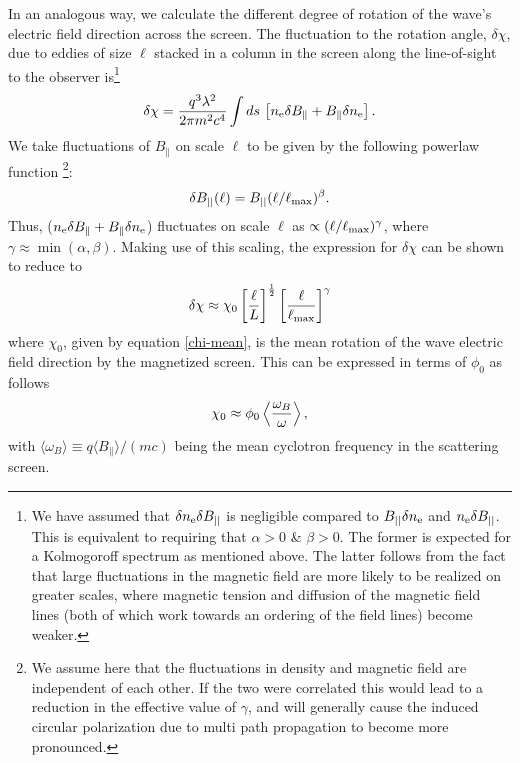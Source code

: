 \documentclass[fleqn,usenatbib]{mnras}
\begin{document}
	In an analogous way, we calculate the different degree of rotation of the wave's electric field direction across the screen. The fluctuation to the rotation angle, $\delta\chi$, due to eddies of size $\ell$ stacked in a column in the screen along the line-of-sight to the observer is\footnote{We have assumed that $\delta n_{\rm e} \delta B_{||}$ is negligible compared to $B_{||}\delta n_{\rm e}$ and $n_{\rm e}\delta B_{||}$. This is equivalent to requiring that $\alpha>0$ \& $\beta>0$. The former is expected for a Kolmogoroff spectrum as mentioned above. The latter follows from the fact that large fluctuations in the magnetic field are more likely to be realized on greater scales, where magnetic tension and diffusion of the magnetic field lines (both of which work towards an ordering of the field lines) become weaker.}
	\begin{equation}
		\delta\chi = {q^3\lambda^2\over 2\pi m^2 c^4} \int ds\, \left[ n_{\rm e}\delta B_\parallel + B_\parallel \delta n_{\rm e}\right].
	\end{equation}
	We take fluctuations of $B_\parallel$ on scale $\ell$ to be given by the following powerlaw function \footnote{We assume here that the fluctuations in density and magnetic field are independent of each other. If the two were correlated this would lead to a reduction in the effective value of $\gamma$, and will generally cause the induced circular polarization due to multi path propagation to become more pronounced.}:
	\begin{equation}
		\delta B_{||}(\ell)=B_{||}(\ell/\ell_{\rm max})^{\beta}.
	\end{equation}
	Thus, ($n_{\rm e}\delta B_\parallel + B_\parallel \delta n_{\rm e}$) fluctuates on scale $\ell$ as $\propto (\ell/\ell_{\rm max})^{\gamma}$, where $\gamma \approx \min(\alpha,\beta)$. Making use of this scaling, the expression for $\delta\chi$ can be shown to reduce to
	\begin{equation}
		\delta\chi \approx \chi_0 \left[{\ell\over L}\right]^{1\over 2} \left[{\ell\over \ell_{\rm max}}\right]^{\gamma}
		\label{del-chi}
	\end{equation}
	where $\chi_0$, given by equation \ref{chi-mean}, is the mean rotation of the wave electric field direction by the magnetized screen. This can be expressed in terms of $\phi_0$ as follows
	\begin{equation}
		\chi_0 \approx \phi_0 \left\langle {\omega_B\over\omega}\right\rangle,
		\label{chi0}
	\end{equation}
	with $\langle\omega_B\rangle\equiv q \langle B_\parallel\rangle/(m c)$ being the mean cyclotron frequency in the scattering screen. 
	
\end{document}
